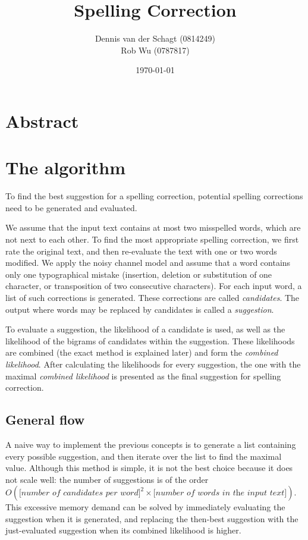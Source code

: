 \documentclass[11pt,a4paper]{article}
\title{Spelling Correction}
\author{
Dennis van der Schagt (0814249)\\
Rob Wu (0787817)
}
\date{\today}
\begin{document}
\maketitle
\newpage
\section*{Abstract}


\section{The algorithm}
To find the best suggestion for a spelling correction, potential spelling corrections need to be generated and evaluated.

We assume that the input text contains at most two misspelled words, which are not next to each other.
To find the most appropriate spelling correction, we first rate the original text, and then re-evaluate the text with one or two words modified.
We apply the noisy channel model and assume that a word contains only one typographical mistake (insertion, deletion or substitution of one character, or transposition of two consecutive characters). For each input word, a list of such corrections is generated. These corrections are called \textit{candidates}. The output where words may be replaced by candidates is called a \textit{suggestion}.

To evaluate a suggestion, the likelihood of a candidate is used, as well as the likelihood of the bigrams of candidates within the suggestion.
These likelihoods are combined (the exact method is explained later) and form the \textit{combined likelihood}.
After calculating the likelihoods for every suggestion, the one with the maximal \textit{combined likelihood} is presented as the final suggestion for spelling correction.

\subsection{General flow}
A naive way to implement the previous concepts is to generate a list containing every possible suggestion, and then iterate over the list to find the maximal value.
Although this method is simple, it is not the best choice because it does not scale well: the number of suggestions is of the order $O(\textit{[number of candidates per word]}^2 \times \textit{[number of words in the input text]})$.
This excessive memory demand can be solved by immediately evaluating the suggestion when it is generated, and replacing the then-best suggestion with the just-evaluated suggestion when its combined likelihood is higher.
\end{document}
